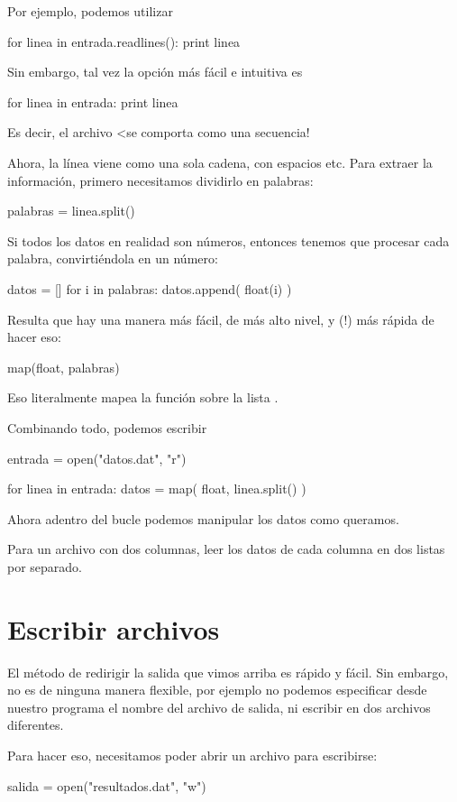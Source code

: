 Por ejemplo, podemos utilizar
\begin{python}
for linea in entrada.readlines():
  print linea
\end{python}
Sin embargo, tal vez la opción más fácil e intuitiva es
\begin{python}
for linea in entrada:
  print linea
\end{python}
Es decir, el archivo <se comporta como una secuencia!

Ahora, la línea viene como una sola cadena, con espacios etc. Para extraer la información, primero necesitamos dividirlo en palabras:
\begin{python}
palabras = linea.split()
\end{python}
Si todos los datos en realidad son números, entonces tenemos que procesar cada palabra, convirtiéndola en un número:
\begin{python}
datos = []
for i in palabras:
  datos.append( float(i) )
\end{python}

Resulta que hay una manera más fácil, de más alto nivel, y (!) más rápida de hacer eso:
\begin{python}
map(float, palabras)
\end{python}
Eso literalmente mapea la función  sobre la lista .

Combinando todo, podemos escribir
\begin{python}
entrada = open("datos.dat", "r")

for linea in entrada:
  datos = map( float, linea.split() )
\end{python}
Ahora adentro del bucle podemos manipular los datos como queramos.

\ej Para un archivo con dos columnas, leer los datos de cada columna en dos listas por separado.


\section{Escribir archivos}

El método de redirigir la salida que vimos arriba es rápido y fácil. Sin embargo, no es de ninguna manera flexible, por ejemplo no 
podemos especificar desde nuestro programa el nombre del archivo de salida, ni escribir en dos archivos diferentes.

Para hacer eso, necesitamos poder abrir un archivo para escribirse:
\begin{python}
salida = open("resultados.dat", "w")
\end{python}

